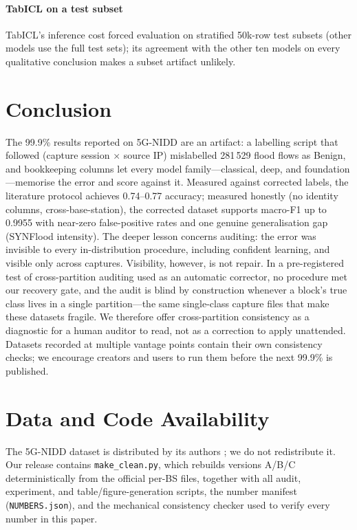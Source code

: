 \documentclass[preprint,12pt]{elsarticle}
\begin{document}
\paragraph{TabICL on a test subset} TabICL's inference cost forced evaluation
on stratified 50k-row test subsets (other models use the full test sets); its
agreement with the other ten models on every qualitative conclusion makes a
subset artifact unlikely.

\section{Conclusion}
\label{sec:conclusion}

The 99.9\% results reported on 5G-NIDD are an artifact: a labelling script
that followed (capture session $\times$ source IP) mislabelled 281\,529 flood
flows as Benign, and bookkeeping columns let every model family---classical,
deep, and foundation---memorise the error and score against it. Measured
against corrected labels, the literature protocol achieves 0.74--0.77
accuracy; measured honestly (no identity columns, cross-base-station), the
corrected dataset supports macro-F1 up to 0.9955 with near-zero false-positive
rates and one genuine generalisation gap (SYNFlood intensity). The deeper
lesson concerns auditing: the error was invisible to every in-distribution
procedure, including confident learning, and visible only across captures.
Visibility, however, is not repair. In a pre-registered test of cross-partition
auditing used as an automatic corrector, no procedure met our recovery gate, and
the audit is blind by construction whenever a block's true class lives in a
single partition---the same single-class capture files that make these datasets
fragile. We therefore offer cross-partition consistency as a diagnostic for a
human auditor to read, not as a correction to apply unattended.
Datasets recorded at multiple vantage points contain their own consistency
checks; we encourage creators and users to run them before the next
99.9\% is published.

\section{Data and Code Availability}
\label{sec:availability}

The 5G-NIDD dataset is distributed by its authors
\citep{samarakoon2022_5gnidd}; we do not redistribute it. Our release contains
\texttt{make\_clean.py}, which rebuilds versions A/B/C deterministically from
the official per-BS files, together with all audit, experiment, and
table/figure-generation scripts, the number manifest (\texttt{NUMBERS.json}),
and the mechanical consistency checker used to verify every number in this
paper.



\end{document}
